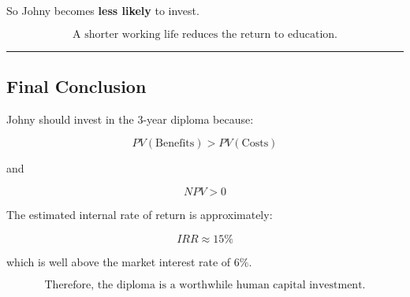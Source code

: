 \documentclass[12pt]{article}
\begin{document}
So Johny becomes \textbf{less likely} to invest.

\[
\boxed{\text{A shorter working life reduces the return to education.}}
\]

\hrule
\vspace{0.8em}

\subsection*{Final Conclusion}

Johny should invest in the 3-year diploma because:

\[
PV(\text{Benefits}) > PV(\text{Costs})
\]

and

\[
NPV > 0
\]

The estimated internal rate of return is approximately:

\[
\boxed{IRR \approx 15\%}
\]

which is well above the market interest rate of \(6\%\).

\[
\boxed{\text{Therefore, the diploma is a worthwhile human capital investment.}}
\]
\end{document}
